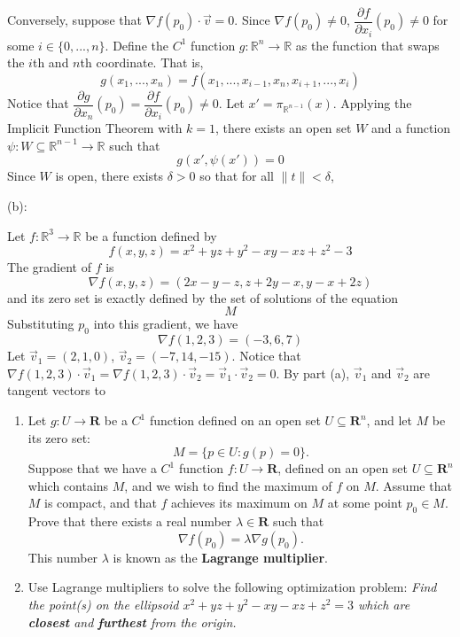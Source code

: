 \documentclass{article}
\newcommand{\R}{\mathbf{R}}
\theoremstyle{plain} %
\numberwithin{thm}{section} %
\theoremstyle{definition}
\begin{document}
\begin{question}{32}
        \medskip

        Conversely, suppose that \(\nabla f(p_0) \cdot \vec{v} = 0\). Since \(\nabla f(p_0) \neq 0\), \(\dfrac{\partial f}{\partial x_i}(p_0) \neq 0\) for some \(i \in \{0, ..., n\}\). Define the \(C^1\) function \(g: \mathbb{R}^n \to \mathbb{R}\) as the function that swaps the \(i\)th and \(n\)th coordinate. That is,
        \[
            g(x_1, ..., x_n) = f(x_1, ..., x_{i-1}, x_n, x_{i+1}, ..., x_i)
        \]
        Notice that \(\dfrac{\partial g}{\partial x_n}(p_0) = \dfrac{\partial f}{\partial x_i}(p_0) \neq 0\). Let \(x' = \pi_{\mathbb{R}^{n-1}}(x)\). Applying the Implicit Function Theorem with \(k = 1\), there exists an open set \(W\) and a function \(\psi : W \subseteq \mathbb{R}^{n-1} \to \mathbb{R}\) such that
        \[
            g(x', \psi(x')) = 0
        \]
        Since \(W\) is open, there exists \(\delta > 0\) so that for all \(\|t\| < \delta\),

        \medskip

        \noindent(b):

        Let \(f: \mathbb{R}^3 \to \mathbb{R}\) be a function defined by
        \[
            f(x,y,z) = x^2 + yz + y^2 - xy -xz + z^2 - 3
        \]
        The gradient of \(f\) is
        \[
            \nabla f(x,y,z) = (2x - y - z, z + 2y - x, y - x + 2z)
        \]
        and its zero set is exactly defined by the set of solutions of the equation
        \[
            M
        \]
        Substituting \(p_0\) into this gradient, we have
        \[
            \nabla f(1,2,3) = (-3, 6, 7)
        \]
        Let \(\vec{v}_1 = (2, 1, 0)\), \(\vec{v}_2 = (-7, 14, -15)\). Notice that \(\nabla f(1,2,3) \cdot \vec{v}_1 = \nabla f(1,2,3) \cdot \vec{v}_2 = \vec{v}_1 \cdot \vec{v}_2 = 0\). By part (a), \(\vec{v}_1\) and \(\vec{v}_2\) are tangent vectors to 
    \end{question}
	\newpage
	\begin{question}{33}
		\begin{enumerate}[label=(\alph*)]
            \item Let $g:U\rightarrow \R$ be a $C^1$ function defined on an open set $U\subseteq \R^n$, and let $M$ be its zero set:
                \[ M = \{ p\in U : g(p)=0 \}. \]
            Suppose that we have a $C^1$ function $f:U\rightarrow \R$, defined on an open set $U\subseteq \R^n$ which contains $M$, and we wish to find the maximum of $f$ on $M$. Assume that $M$ is compact, and that $f$ achieves its maximum on $M$ at some point $p_0\in M$. Prove that there exists a real number $\lambda \in \R$ such that
                \[ \nabla f(p_0) = \lambda \nabla g(p_0). \]
            This number $\lambda$ is known as the \textbf{Lagrange multiplier}.
    
            \item Use Lagrange multipliers to solve the following optimization problem: \textit{Find the point(s) on the ellipsoid $x^2 + yz + y^2 - xy - xz + z^2 = 3$ which are \textbf{closest} and \textbf{furthest} from the origin.}
        \end{enumerate}
	\end{question}
\end{document}

